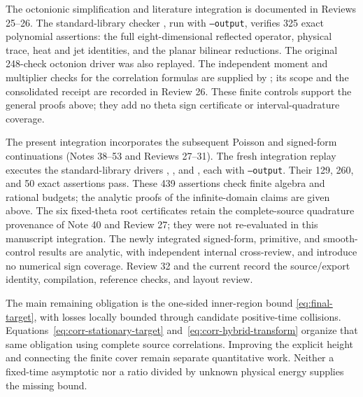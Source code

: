 \documentclass[11pt]{article}
\numberwithin{equation}{section}
\theoremstyle{definition}
\theoremstyle{remark}
\begin{document}
The octonionic simplification and literature integration is documented
in Reviews 25--26. The standard-library checker
, run with
\texttt{--output}, verifies 325 exact polynomial assertions: the full
eight-dimensional reflected operator, physical trace, heat and jet
identities, and the planar bilinear reductions. The original 248-check
octonion driver was also replayed. The independent moment and multiplier
checks for the correlation formulas are supplied by
; its scope and
the consolidated receipt are recorded in Review 26. These finite
controls support the general proofs above; they add no theta sign
certificate or interval-quadrature coverage.

The present integration incorporates the subsequent Poisson and signed-form
continuations (Notes 38--53 and Reviews 27--31). The fresh integration
replay executes the standard-library drivers
,
, and
, each with
\texttt{--output}. Their 129, 260, and 50 exact assertions pass.
These 439 assertions check finite algebra and rational budgets; the
analytic proofs of the infinite-domain claims are given above.
The six fixed-theta root certificates retain the complete-source
quadrature provenance of Note 40 and Review 27; they were not re-evaluated
in this manuscript integration. The newly integrated signed-form,
primitive, and smooth-control results are analytic, with independent
internal cross-review, and introduce no numerical sign coverage.
Review 32 and the current  record the
source/export identity, compilation, reference checks, and layout review.

The main remaining obligation is the one-sided inner-region bound
\eqref{eq:final-target}, with losses locally bounded through candidate
positive-time collisions. Equations~\eqref{eq:corr-stationary-target}
and~\eqref{eq:corr-hybrid-transform} organize that same obligation
using complete source correlations. Improving the explicit height and
connecting the finite cover remain separate quantitative work.
Neither a fixed-time asymptotic nor a ratio divided by unknown physical
energy supplies the missing bound.

\par\endgroup
\end{document}

